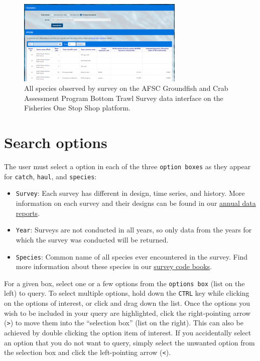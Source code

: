 \documentclass[
  letterpaper,
  oneside,
  open=any]{scrbook}
\providecommand{\tightlist}{%
  \setlength{\itemsep}{0pt}\setlength{\parskip}{0pt}}\usepackage{longtable,booktabs,array}
\begin{document}
\begin{figure}[H]

{\centering \includegraphics[width=3.12in,height=\textheight]{content/../img/foss_1_interface_species.png}

}

\caption{All species observed by survey on the AFSC Groundfish and Crab
Assessment Program Bottom Trawl Survey data interface on the Fisheries
One Stop Shop platform.}

\end{figure}%

\section{Search options}\label{search-options}

The user must select a option in each of the three
\texttt{option\ boxes} as they appear for \texttt{catch}, \texttt{haul},
and \texttt{species}:

\begin{itemize}
\tightlist
\item
  \texttt{Survey}: Each survey has different in design, time series, and
  history. More information on each survey and their designs can be
  found in our
  \href{https://www.fisheries.noaa.gov/alaska/science-data/groundfish-assessment-program-bottom-trawl-surveys\#data-products}{annual
  data reports}.
\item
  \texttt{Year}: Surveys are not conducted in all years, so only data
  from the years for which the survey was conducted will be returned.
\item
  \texttt{Species}: Common name of all species ever encountered in the
  survey. Find more information about these species in our
  \href{https://www.fisheries.noaa.gov/resource/document/groundfish-survey-species-code-manual-and-data-codes-manual}{survey
  code books}.
\end{itemize}

For a given box, select one or a few options from the
\texttt{options\ box} (list on the left) to query. To select multiple
options, hold down the \texttt{CTRL} key while clicking on the options
of interest, or click and drag down the list. Once the options you wish
to be included in your query are highlighted, click the right-pointing
arrow (\texttt{\textgreater{}}) to move them into the ``selection box''
(list on the right). This can also be achieved by double clicking the
option item of interest. If you accidentally select an option that you
do not want to query, simply select the unwanted option from the
selection box and click the left-pointing arrow (\texttt{\textless{}}).
\end{document}
